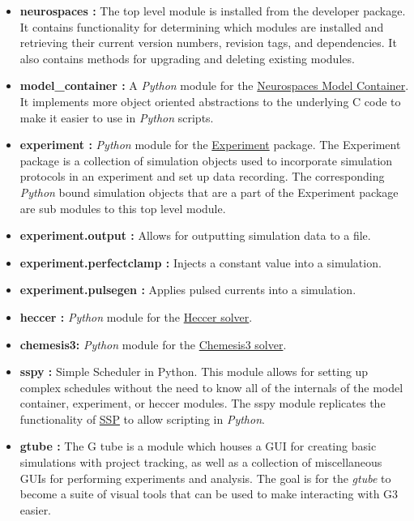\documentclass[12pt]{article}
\begin{document}
\begin{itemize}

\item[] {\bf neurospaces :}  The top level module is installed from the developer package. It contains functionality for determining which modules are installed and retrieving their current version numbers, revision tags, and dependencies. It also contains methods for upgrading and deleting existing modules. 

\item[] {\bf model\_container :} A {\it Python} module for the \href{../model-container/model-container.tex}{Neurospaces Model Container}. It implements more object oriented abstractions to the underlying C code to make it easier to use in {\it Python} scripts.

\item[]{\bf experiment :}  {\it Python} module for the \href{../experiment/experiment.tex}{Experiment} package. The Experiment package is a collection of simulation objects used to incorporate simulation protocols in an experiment and set up data recording. The corresponding {\it Python} bound simulation objects that are a part of the Experiment package are sub modules to this top level module.

\item[]{\bf experiment.output :} Allows for outputting simulation data to a file.

\item[]{\bf experiment.perfectclamp :} Injects a constant value into a simulation.

\item[]{\bf experiment.pulsegen :} Applies pulsed currents into a simulation.

\item[]{\bf heccer :} {\it Python} module for the \href{../heccer/heccer.tex}{Heccer solver}. 

\item[]{\bf chemesis3:} {\it Python} module for the \href{../chemesis-3-log/chemesis-3-log.tex}{Chemesis3 solver}. 

\item []{\bf sspy :} Simple Scheduler in Python. This module allows for setting up complex schedules without the need to know all of the internals of the model container, experiment, or heccer modules. The sspy module replicates the functionality of \href{../ssp/ssp.tex}{SSP} to allow scripting in {\it Python}.

\item[]{\bf gtube :} The G tube is a module which houses a GUI for creating basic simulations with project tracking, as well as a collection of miscellaneous GUIs for performing experiments and analysis. The goal is for the {\it gtube} to become a suite of visual tools that can be used to make interacting with G3 easier.

\end{itemize}
    
\end{document}
